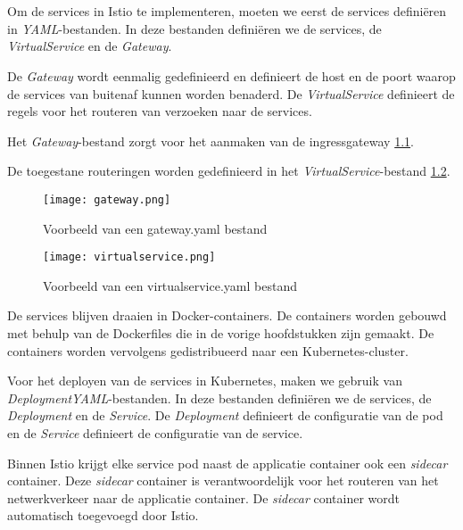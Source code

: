 \chapter{}
\label{ch:implementatie-backend-istio}

Om de services in Istio te implementeren, moeten we eerst de services definiëren in \textit{YAML}-bestanden. In deze bestanden definiëren we de services, de \textit{VirtualService} en de \textit{Gateway}.

De \textit{Gateway} wordt eenmalig gedefinieerd en definieert de host en de poort waarop de services van buitenaf kunnen worden benaderd. De \textit{VirtualService} definieert de regels voor het routeren van verzoeken naar de services.

Het \textit{Gateway}-bestand zorgt voor het aanmaken van de ingressgateway \ref{fig:gateway}.

De toegestane routeringen worden gedefinieerd in het \textit{VirtualService}-bestand \ref{fig:virtualservice}.

\begin{figure}[H]
    \centering	
    \texttt{[image: gateway.png]} 
    \caption{Voorbeeld van een gateway.yaml bestand} 
    \label{fig:gateway}
\end{figure}

\begin{figure}[H]
    \centering	
    \texttt{[image: virtualservice.png]} 
    \caption{Voorbeeld van een virtualservice.yaml bestand} 
    \label{fig:virtualservice}
\end{figure}

De services blijven draaien in Docker-containers. De containers worden gebouwd met behulp van de Dockerfiles die in de vorige hoofdstukken zijn gemaakt. De containers worden vervolgens gedistribueerd naar een Kubernetes-cluster.

Voor het deployen van de services in Kubernetes, maken we gebruik van \textit{DeploymentYAML}-bestanden. In deze bestanden definiëren we de services, de \textit{Deployment} en de \textit{Service}. De \textit{Deployment} definieert de configuratie van de pod en de \textit{Service} definieert de configuratie van de service.

Binnen Istio krijgt elke service pod naast de applicatie container ook een \textit{sidecar} container. Deze \textit{sidecar} container is verantwoordelijk voor het routeren van het netwerkverkeer naar de applicatie container. De \textit{sidecar} container wordt automatisch toegevoegd door Istio.

